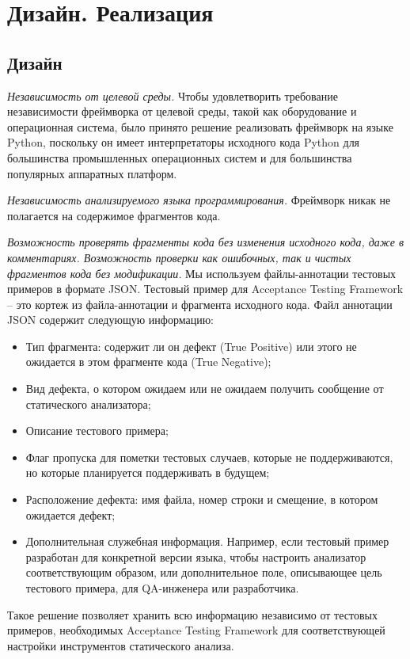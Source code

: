 \chapter{Дизайн. Реализация}\label{ch:ch3}

\section{Дизайн}\label{sec:ch3/sect1}

\textit{Независимость от целевой среды.} Чтобы удовлетворить требование независимости фреймворка от целевой среды, такой как оборудование и операционная
система, было принято решение реализовать фреймворк на языке Python, поскольку он имеет интерпретаторы исходного кода Python для большинства промышленных операционных систем и для большинства популярных
аппаратных платформ.

\textit{Независимость анализируемого языка программирования.} Фреймворк
никак не полагается на содержимое фрагментов кода.

\textit{Возможность проверять фрагменты кода без изменения исходного кода,
даже в комментариях. Возможность проверки как ошибочных, так и чистых
фрагментов кода без модификации.} Мы используем файлы-аннотации тестовых
примеров в формате JSON. Тестовый пример для Acceptance Testing Framework
-- это кортеж из файла-аннотации и фрагмента исходного кода. Файл аннотации
JSON содержит следующую информацию:
\begin{itemize}
\item Тип фрагмента: содержит ли он дефект (True Positive) или этого не ожидается в этом фрагменте кода (True Negative);
\item Вид дефекта, о котором ожидаем или не ожидаем получить сообщение от статического анализатора;
\item Описание тестового примера;
\item Флаг пропуска для пометки тестовых случаев, которые не поддерживаются, но которые планируется поддерживать в будущем;
\item Расположение дефекта: имя файла, номер строки и смещение, в котором ожидается дефект;
\item Дополнительная служебная информация. Например, если тестовый пример разработан для конкретной версии языка, чтобы настроить анализатор соответствующим образом, или дополнительное поле, описывающее
цель тестового примера, для QA-инженера или разработчика.
\end{itemize}

Такое решение позволяет хранить всю информацию независимо от тестовых примеров, необходимых Acceptance Testing Framework для соответствующей настройки инструментов статического анализа.

